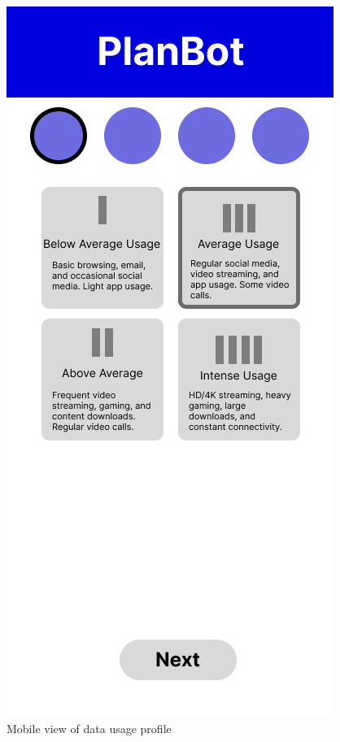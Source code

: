 \documentclass[conference]{IEEEtran}
\begin{document}
\begin{figure}[H]
    \centering
    \includegraphics[width=1\linewidth]{Mobile/Group 15MOBILE.png}
    \caption{Mobile view of data usage profile}
    \label{fig:user flow}
\end{figure}
\end{document}
